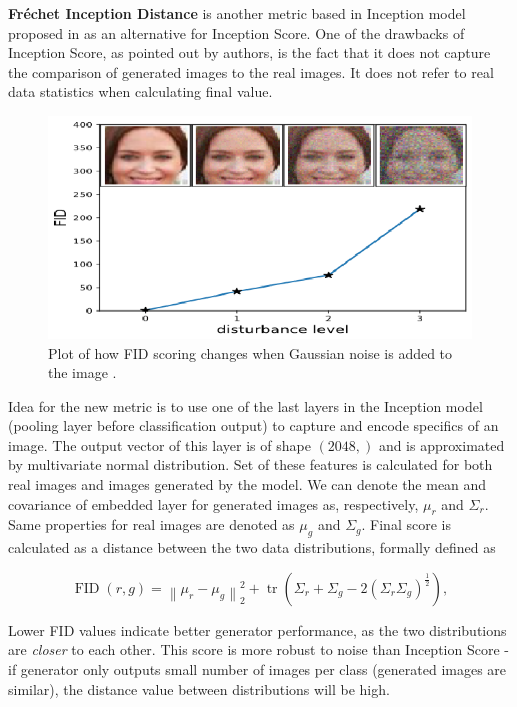 \documentclass[12pt,a4paper,openany]{book}
\begin{document}
\noindent \textbf{Fr\'echet Inception Distance} is another metric based in Inception model proposed in \cite{fid} as an alternative for Inception Score. One of the drawbacks of Inception Score, as pointed out by authors, is the fact that it does not capture the comparison of generated images to the real images. It does not refer to real data statistics when calculating final value.

 \begin{figure}[ht!]
     \centering
     \includegraphics[scale=1.6]{figs/fid.eps}
     \caption{Plot of how FID scoring changes when Gaussian noise is added to the image \cite{fid}.}\label{Fig:FID}
 \end{figure}
 
\noindent Idea for the new metric is to use one of the last layers in the Inception model (pooling layer before classification output) to capture and encode specifics of an image. The output vector of this layer is of shape $(2048,)$ and is approximated by multivariate normal distribution. Set of these features is calculated for both real images and images generated by the model. We can denote the mean and covariance of embedded layer for generated images as, respectively, $\mu_{r}$ and  $\Sigma_{r}$. Same properties for real images are denoted as $\mu_{g}$ and $\Sigma_{g}$. Final score is calculated as a distance between the two data distributions, formally defined as

\begin{equation}
\operatorname{FID}(r, g)=\left\|\mu_{r}-\mu_{g}\right\|_{2}^{2}+\operatorname{tr}\left(\Sigma_{r}+\Sigma_{g}-2\left(\Sigma_{r} \Sigma_{g}\right)^{\frac{1}{2}}\right),
\end{equation}

\noindent Lower FID values indicate better generator performance, as the two distributions are \textit{closer} to each other. This score is more robust to noise than Inception Score - if generator only outputs small number of images per class (generated images are similar), the distance value between distributions will be high.
\end{document}
